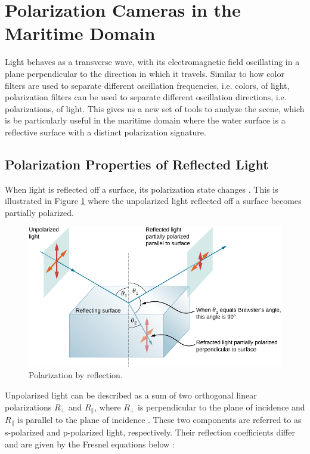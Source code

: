 \section{Polarization Cameras in the Maritime Domain}
Light behaves as a transverse wave, with its electromagnetic field oscillating in a plane perpendicular to the direction in which it travels.
Similar to how color filters are used to separate different oscillation frequencies, i.e. colors, of light, polarization filters can be used to separate different oscillation directions, i.e. polarizations, of light.
This gives us a new set of tools to analyze the scene, which is be particularly useful in the maritime domain where the water surface is a reflective surface with a distinct polarization signature.

\subsection{Polarization Properties of Reflected Light}
When light is reflected off a surface, its polarization state changes \cite[34]{lingUniversityPhysicsVolume2016}.
This is illustrated in Figure \ref{fig:polarized_reflection} where the unpolarized light reflected off a surface becomes partially polarized.
\begin{figure}[H]
    \centering
    \includegraphics[width=.8\linewidth]{figures/polarization/reflaction.png}
    \caption{Polarization by reflection.
        \cite[Figure 1.38]{lingUniversityPhysicsVolume2016}}
    \label{fig:polarized_reflection}
\end{figure}


Unpolarized light can be described as a sum of two orthogonal linear polarizations $R_\perp$ and $R_\parallel$, where $R_\perp$ is perpendicular to the plane of incidence and $R_\parallel$ is parallel to the plane of incidence  \cite{FresnelEquations2024}.
These two components are referred to as s-polarized and p-polarized light, respectively.
Their reflection coefficients differ and are given by the Fresnel equations below \cite{FresnelEquations2024}:

